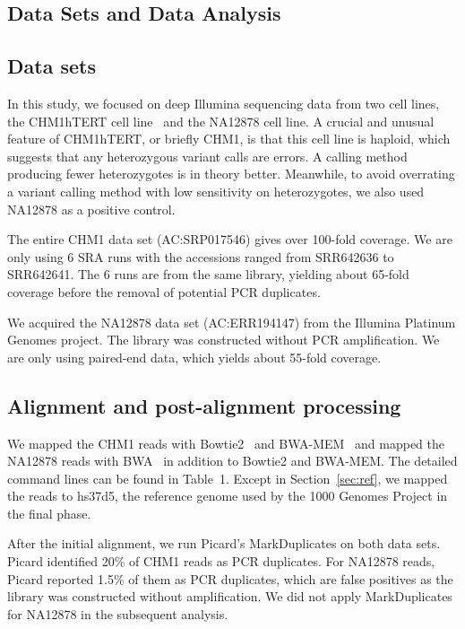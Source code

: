 \documentclass{bioinfo}
\begin{document}
\begin{methods}
\section{Data Sets and Data Analysis}

\subsection{Data sets}

In this study, we focused on deep Illumina sequencing data from two cell lines,
the CHM1hTERT cell line~\citep{Jacobs:1980aa} and the NA12878 cell line. A
crucial and unusual feature of CHM1hTERT, or briefly CHM1, is that this cell
line is haploid, which suggests that any heterozygous variant calls are errors.
A calling method producing fewer heterozygotes is in theory better. Meanwhile,
to avoid overrating a variant calling method with low sensitivity on
heterozygotes, we also used NA12878 as a positive control.

The entire CHM1 data set (AC:SRP017546) gives over 100-fold coverage. We are
only using 6 SRA runs with the accessions ranged from SRR642636 to SRR642641.
The 6 runs are from the same library, yielding about 65-fold coverage before
the removal of potential PCR duplicates.

We acquired the NA12878 data set (AC:ERR194147) from the Illumina Platinum
Genomes project. The library was constructed without PCR amplification. We are
only using paired-end data, which yields about 55-fold coverage.

\subsection{Alignment and post-alignment processing}

We mapped the CHM1 reads with Bowtie2~\citep{Langmead:2012fk} and
BWA-MEM~\citep{Li:2013aa} and mapped the NA12878 reads with
BWA~\citep{Li:2009uq} in addition to Bowtie2 and BWA-MEM. The detailed command
lines can be found in Table~1. Except in Section~\ref{sec:ref}, we mapped the
reads to hs37d5, the reference genome used by the 1000 Genomes Project in the
final phase.

After the initial alignment, we run Picard's MarkDuplicates on both data sets.
Picard identified 20\% of CHM1 reads as PCR duplicates. For NA12878 reads,
Picard reported 1.5\% of them as PCR duplicates, which are false positives as
the library was constructed without amplification. We did not apply
MarkDuplicates for NA12878 in the subsequent analysis.


\end{methods}
\end{document}
